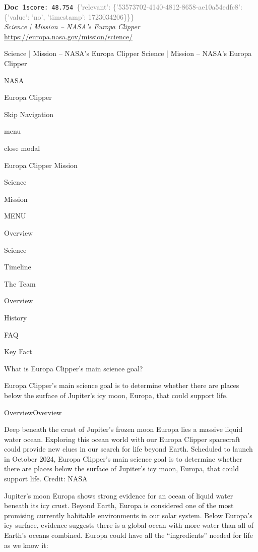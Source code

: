 \documentclass[a4paper,11pt]{article}
\begin{document}
\begin{docenv}
{\footnotesize\textcolor{doccolor}{\textbf{Doc~1}}}\hfill{\tiny\texttt{score:~48.754}}\ {\tiny\textcolor{gray}{\{'relevant': \{'53573702-4140-4812-8658-ae10a54edfc8': \{'value': 'no', 'timestamp': 1723034206\}\}\}}}\\[3pt]
{\small\textit{Science | Mission – NASA's Europa Clipper}}\\[2pt]
{\tiny\url{https://europa.nasa.gov/mission/science/}}\\[4pt]
{\footnotesize Science | Mission – NASA's Europa Clipper
Science | Mission – NASA's Europa Clipper

NASA

Europa Clipper

Skip Navigation

menu

close modal

Europa Clipper Mission

Science

Mission

MENU

Overview

Science

Timeline

The Team

Overview

History

FAQ

Key Fact

What is Europa Clipper's main science goal? 

Europa Clipper’s main science goal is to determine whether there are places below the surface of Jupiter’s icy moon, Europa, that could support life.

OverviewOverview

Deep beneath the crust of Jupiter’s frozen moon Europa lies a massive liquid water ocean. Exploring this ocean world with our Europa Clipper spacecraft could provide new clues in our search for life beyond Earth. Scheduled to launch in October 2024, Europa Clipper’s main science goal is to determine whether there are places below the surface of Jupiter’s icy moon, Europa, that could support life. Credit: NASA

Jupiter’s moon Europa shows strong evidence for an ocean of liquid water beneath its icy crust. Beyond Earth, Europa is considered one of the most promising currently habitable environments in our solar system. 
Below Europa’s icy surface, evidence suggests there is a global ocean with more water than all of Earth’s oceans combined. Europa could have all the “ingredients” needed for life as we know it: 

}
\end{docenv}
\end{document}
